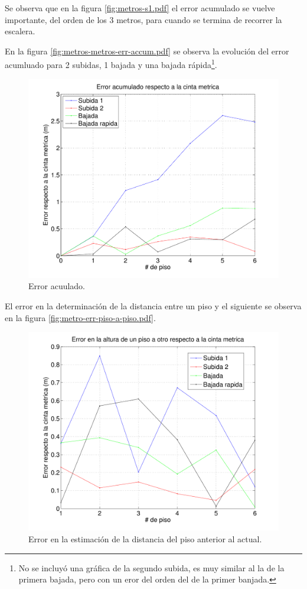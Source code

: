 \documentclass[spanish,12pt,a4paper,titlepage]{report}
\begin{document}
Se observa que en la figura \ref{fig:metros-s1.pdf} el error acumulado se vuelve importante, del orden de los 3 metros, para cuando se termina de recorrer la escalera.

En la figura \ref{fig:metros-metros-err-accum.pdf} se observa la evolución del error acumluado para 2 subidas, 1 bajada y una bajada rápida\footnote{No se incluyó una gráfica de la segundo subida, es muy similar al la de la primera bajada, pero con un eror del orden del de la primer banjada.}.

\begin{figure}[h!]
\centering
  \includegraphics[width=.85\textwidth]{./pics/metros-err-accum.pdf}
\vspace{-15pt}
  \caption{Error acuulado.}
  \label{fig:metros-err-accum.pdf}
\vspace{-15pt}
\end{figure}

El error en la determinación de la distancia entre un piso y el siguiente se observa en la figura \ref{fig:metro-err-piso-a-piso.pdf}.

\begin{figure}[h!]
\centering
  \includegraphics[width=.85\textwidth]{./pics/metros-err-piso-a-piso.pdf}
\vspace{-15pt}
  \caption{Error en la estimación de la distancia del piso anterior al actual.}
  \label{fig:metros-err-piso-a-piso.pdf}
\vspace{-15pt}
\end{figure}
\vspace{-15pt}
\end{document}
